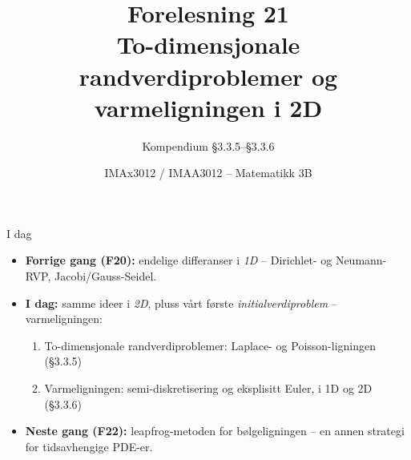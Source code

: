 \documentclass[11pt,aspectratio=169]{beamer}
\title[F21 -- 2D Randverdiproblemer]{Forelesning 21\\ To-dimensjonale randverdiproblemer og varmeligningen i 2D}
\subtitle{Kompendium §3.3.5--§3.3.6}
\author{IMAx3012 / IMAA3012 -- Matematikk 3B}
\date{}
\begin{document}
\begin{frame}
\titlepage
\end{frame}

\begin{frame}{I dag}
\begin{itemize}
\item \textbf{Forrige gang (F20):} endelige differanser i \emph{1D} -- Dirichlet- og Neumann-RVP, Jacobi/Gauss-Seidel.
\item \textbf{I dag:} samme ideer i \emph{2D}, pluss vårt første \emph{initialverdiproblem} -- varmeligningen:
  \begin{enumerate}
  \item To-dimensjonale randverdiproblemer: Laplace- og Poisson-ligningen (§3.3.5)
  \item Varmeligningen: semi-diskretisering og eksplisitt Euler, i 1D og 2D (§3.3.6)
  \end{enumerate}
\item \textbf{Neste gang (F22):} leapfrog-metoden for bølgeligningen -- en annen strategi for tidsavhengige PDE-er.
\end{itemize}
\end{frame}
\end{document}
